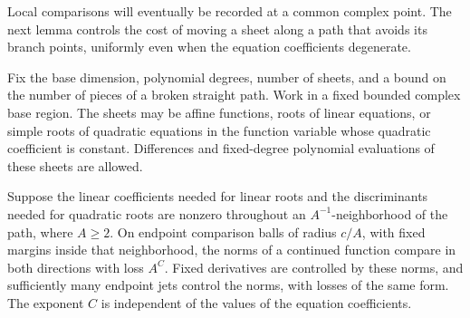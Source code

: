 Local comparisons will eventually be recorded at a common complex
point.  The next lemma controls the cost of moving a sheet along a
path that avoids its branch points, uniformly even when the equation
coefficients degenerate.

\begin{lemma}
\label{a02:algebraic-path}
Fix the base dimension, polynomial degrees, number of sheets, and a
bound on the number of pieces of a broken straight path.  Work in a
fixed bounded complex base region.  The sheets may be affine functions,
roots of linear equations, or simple roots of quadratic equations in
the function variable whose quadratic coefficient is constant.
Differences and fixed-degree polynomial evaluations of these sheets
are allowed.

Suppose the linear coefficients needed for linear roots and the
discriminants needed for quadratic roots are nonzero throughout an
\(A^{-1}\)-neighborhood of the path, where \(A\ge2\).  On endpoint
comparison balls of radius \(c/A\), with fixed margins inside that
neighborhood, the norms of a continued function compare in both
directions with loss \(A^C\).  Fixed derivatives are controlled by
these norms, and sufficiently many endpoint jets control the norms,
with losses of the same form.  The exponent \(C\) is independent of
the values of the equation coefficients.
\end{lemma}

